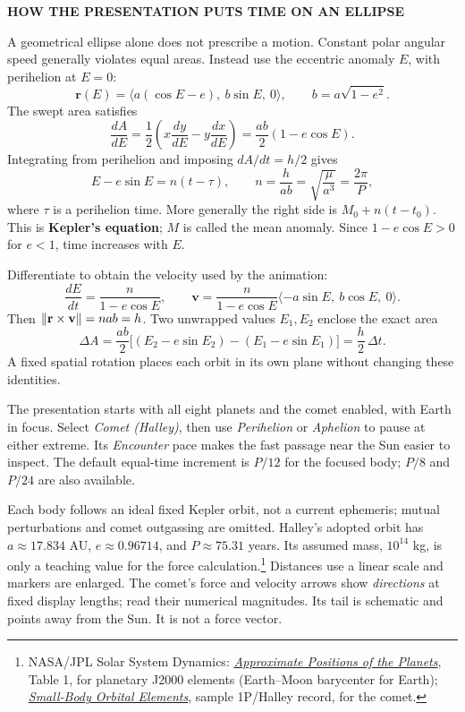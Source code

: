 \documentclass[11pt,letterpaper]{article}
\newcommand{\R}{\mathbf r}\newcommand{\V}{\mathbf v}\newcommand{\A}{\mathbf a}
\newcommand{\heading}[1]{\vspace{3pt}{\large\bfseries #1}\par}
\newcommand{\tagline}[1]{{\small\bfseries\color{inkblue}#1}\par}
\begin{document}
\newpage
\tagline{HOW THE PRESENTATION PUTS TIME ON AN ELLIPSE}
\heading{The eccentric anomaly and Kepler's equation}
A geometrical ellipse alone does not prescribe a motion. Constant polar angular speed generally violates equal areas. Instead use the eccentric anomaly $E$, with perihelion at $E=0$:
\[
 \R(E)=\langle a(\cos E-e),\ b\sin E,\ 0\rangle,
 \qquad b=a\sqrt{1-e^2}.
\]
The swept area satisfies
\[
 \frac{dA}{dE}
 =\frac12\left(x\frac{dy}{dE}-y\frac{dx}{dE}\right)
 =\frac{ab}{2}(1-e\cos E).
\]
Integrating from perihelion and imposing $dA/dt=h/2$ gives
\[
 E-e\sin E=n(t-\tau),\qquad
 n=\frac h{ab}=\sqrt{\frac\mu{a^3}}=\frac{2\pi}{P},
\]
where $\tau$ is a perihelion time. More generally the right side is $M_0+n(t-t_0)$. This is \textbf{Kepler's equation}; $M$ is called the mean anomaly. Since $1-e\cos E>0$ for $e<1$, time increases with $E$.

Differentiate to obtain the velocity used by the animation:
\[
 \frac{dE}{dt}=\frac{n}{1-e\cos E},\qquad
 \V=\frac{n}{1-e\cos E}\langle-a\sin E,\ b\cos E,\ 0\rangle.
\]
Then $\norm{\R\times\V}=nab=h$. Two unwrapped values $E_1,E_2$ enclose the exact area
\[
 \Delta A=\frac{ab}{2}\bigl[(E_2-e\sin E_2)-(E_1-e\sin E_1)\bigr]
 =\frac h2\,\Delta t.
\]
A fixed spatial rotation places each orbit in its own plane without changing these identities.

\heading{Using and interpreting the solar model}
The presentation starts with all eight planets and the comet enabled, with Earth in focus. Select \emph{Comet (Halley)}, then use \emph{Perihelion} or \emph{Aphelion} to pause at either extreme. Its \emph{Encounter} pace makes the fast passage near the Sun easier to inspect. The default equal-time increment is $P/12$ for the focused body; $P/8$ and $P/24$ are also available.

Each body follows an ideal fixed Kepler orbit, not a current ephemeris; mutual perturbations and comet outgassing are omitted. Halley's adopted orbit has $a\approx17.834$ AU, $e\approx0.96714$, and $P\approx75.31$ years. Its assumed mass, $10^{14}$ kg, is only a teaching value for the force calculation.\footnote{NASA/JPL Solar System Dynamics: \href{https://ssd.jpl.nasa.gov/planets/approx_pos.html}{\emph{Approximate Positions of the Planets}}, Table 1, for planetary J2000 elements (Earth--Moon barycenter for Earth); \href{https://ssd.jpl.nasa.gov/sb/elem_tables.html}{\emph{Small-Body Orbital Elements}}, sample 1P/Halley record, for the comet.} Distances use a linear scale and markers are enlarged. The comet's force and velocity arrows show \emph{directions} at fixed display lengths; read their numerical magnitudes. Its tail is schematic and points away from the Sun. It is not a force vector.
\end{document}
